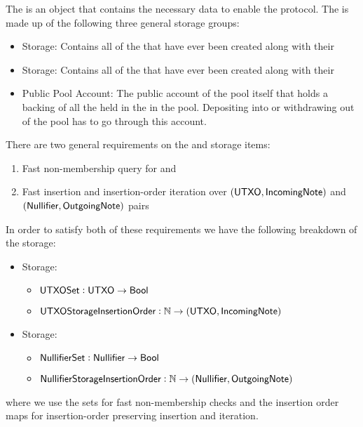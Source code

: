 
The \ShieldedPool{} is an object that contains the necessary data to enable the \MantaPay{} \Transfer{} protocol. The \ShieldedPool{} is made up of the following three general storage groups:

\begin{itemize}
    \item \UTXO{} Storage: Contains all of the  that have ever been created along with their 
    \item \Nullifier{} Storage: Contains all of the  that have ever been created along with their 
    \item Public Pool Account: The public account of the pool itself that holds a backing of all the  held in the  in the pool. Depositing into or withdrawing out of the pool has to go through this account.
\end{itemize}

There are two general requirements on the \UTXO{} and \Nullifier{} storage items:

\begin{enumerate}
    \item Fast non-membership query for  and 
    \item Fast insertion and insertion-order iteration over $({\textsf{UTXO}}{}, {\textsf{IncomingNote}}{})$ and $({\textsf{Nullifier}}{}, {\textsf{OutgoingNote}}{})$ pairs
\end{enumerate}

In order to satisfy both of these requirements we have the following breakdown of the storage:

\begin{itemize}
    \item \UTXO{} Storage:
        \begin{itemize}
            \item ${\textsf{UTXOSet}}: {\textsf{UTXO}} \to {\textsf{Bool}}$
            \item ${\textsf{UTXOStorageInsertionOrder}}: \mathbb{N} \to ({\textsf{UTXO}}, {\textsf{IncomingNote}})$
        \end{itemize}
    \item \Nullifier{} Storage:
        \begin{itemize}
            \item ${\textsf{NullifierSet}}: {\textsf{Nullifier}} \to {\textsf{Bool}}$
            \item ${\textsf{NullifierStorageInsertionOrder}}: \mathbb{N} \to ({\textsf{Nullifier}}, {\textsf{OutgoingNote}})$
        \end{itemize}
\end{itemize}

where we use the sets for fast non-membership checks and the insertion order maps for insertion-order preserving insertion and iteration.

